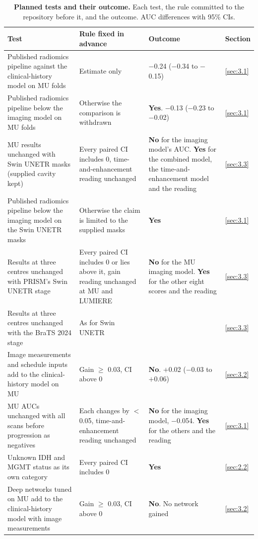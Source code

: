 \begin{table}[!htbp]
\centering
\caption[Planned tests]{\textbf{Planned tests and their outcome.} Each test, the rule committed to the repository
before it, and the outcome. AUC differences with 95\% CIs.}
\label{tab:2}
\begin{threeparttable}
\footnotesize
\zebrarows
\begin{tabularx}{\linewidth}{@{}R{4.0cm}R{3.9cm}LR{0.9cm}@{}}
\toprule
Test & Rule fixed in advance & Outcome & Section \\
\midrule
Published radiomics pipeline against the clinical-history model on MU folds & Estimate only & $-$0.24 ($-$0.34 to $-$0.15) & \ref{sec:3.1} \\
Published radiomics pipeline below the imaging model on MU folds & Otherwise the comparison is withdrawn & \textbf{Yes}. $-$0.13 ($-$0.23 to $-$0.02) & \ref{sec:3.1} \\
MU results unchanged with Swin UNETR masks (supplied cavity kept) & Every paired CI includes 0, time-and-enhancement reading unchanged & \textbf{No} for the imaging model's AUC. \textbf{Yes} for the combined model, the time-and-enhancement model and the reading & \ref{sec:3.3} \\
Published radiomics pipeline below the imaging model on the Swin UNETR masks & Otherwise the claim is limited to the supplied masks & \textbf{Yes} & \ref{sec:3.1} \\
Results at three centres unchanged with PRISM's Swin UNETR stage & Every paired CI includes 0 or lies above it, gain reading unchanged at MU and LUMIERE & \textbf{No} for the MU imaging model. \textbf{Yes} for the other eight scores and the reading & \ref{sec:3.3} \\
Results at three centres unchanged with the BraTS 2024 stage & As for Swin UNETR &  & \ref{sec:3.3} \\
Image measurements and schedule inputs add to the clinical-history model on MU & Gain $\geq$ 0.03, CI above 0 & \textbf{No}. $+$0.02 ($-$0.03 to $+$0.06) & \ref{sec:3.2} \\
MU AUCs unchanged with all scans before progression as negatives & Each changes by $<$ 0.05, time-and-enhancement reading unchanged & \textbf{No} for the imaging model, $-$0.054. \textbf{Yes} for the others and the reading & \ref{sec:3.1} \\
Unknown IDH and MGMT status as its own category & Every paired CI includes 0 & \textbf{Yes} & \ref{sec:2.2} \\
Deep networks tuned on MU add to the clinical-history model with image measurements & Gain $\geq$ 0.03, CI above 0 & \textbf{No}. No network gained & \ref{sec:3.2} \\

\end{tabularx}
\end{threeparttable}
\end{table}
